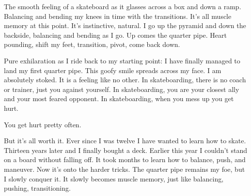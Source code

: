 The smooth feeling of a skateboard as it glasses across a box and down a ramp. Balancing and bending my knees in time with the transitions. It's all muscle memory at this point. It's instinctive, natural. I go up the pyramid and down the backside, balancing and bending as I go. Up comes the quarter pipe. Heart pounding, shift my feet, transition, pivot, come back down.

Pure exhilaration as I ride back to my starting point: I have finally managed to land my first quarter pipe. This goofy smile spreads across my face. I am absolutely stoked. It is a feeling like no other. In skateboarding, there is no coach or trainer, just you against yourself. In skateboarding, you are your closest ally and your most feared opponent. In skateboarding, when you mess up you get hurt.

You get hurt pretty often.

But it's all worth it. Ever since I was twelve I have wanted to learn how to skate. Thirteen years later and I finally bought a deck. Earlier this year I couldn't stand on a board without falling off. It took months to learn how to balance, push, and maneuver. Now it's onto the harder tricks. The quarter pipe remains my foe, but I slowly conquer it. It slowly becomes muscle memory, just like balancing, pushing, transitioning.
